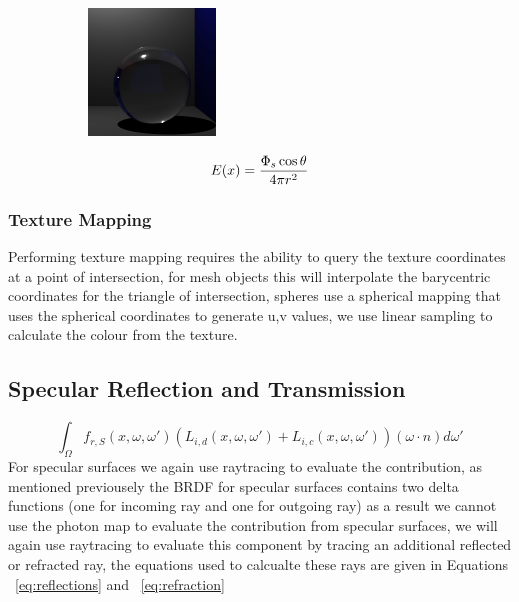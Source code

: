 \begin{figure}
	\centering
	\begin{subfigure}[c]{0.4\textwidth}
	\includegraphics{./images/renders/refraction/render-schlick.png}
	\end{subfigure}
	\begin{subfigure}[b]{0.4\textwidth}
	\begin{equation}
	\centering
		E(x) = \frac
		{
			\Phi_s \cos{\theta}
		}
		{
			4 \pi r^2
		}
	\end{equation}
	\end{subfigure}
\end{figure}

\subsubsection{Texture Mapping}
Performing texture mapping requires the ability to query the texture coordinates at a point of intersection, for mesh objects this
will interpolate the barycentric coordinates for the triangle of intersection, spheres use a spherical mapping that uses the
spherical coordinates to generate u,v values, we use linear sampling to calculate the colour from the texture.

\subsection{Specular Reflection and Transmission}
\begin{equation*}
	\int_{\Omega}
	f_{r,S}(x, \omega, \omega')
	(
		L_{i,d}(x,\omega,\omega')
		+
		L_{i,c}(x,\omega,\omega')
	)
	(\omega \cdot n)d\omega'
\end{equation*}
For specular surfaces we again use raytracing to evaluate the contribution, as mentioned previousely the BRDF for specular surfaces
contains two delta functions (one for incoming ray and one for outgoing ray) as a result we cannot use the photon map to evaluate
the contribution from specular surfaces, we will again use raytracing to evaluate this component by tracing an additional reflected
or refracted ray, the equations used to calcualte these rays are given in Equations ~\ref{eq:reflections} and ~\ref{eq:refraction}

